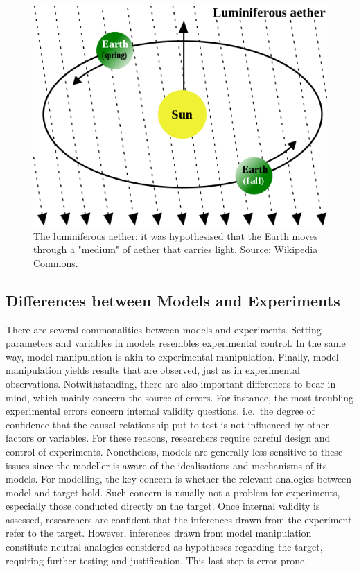 \documentclass[
]{book}
\begin{document}
\begin{figure}

{\centering \includegraphics[width=0.5\linewidth]{Figures/luminiferous_aether} 

}

\caption{The luminiferous aether: it was hypothesised that the Earth moves through a "medium" of aether that carries light. Source: \href{https://commons.wikimedia.org/wiki/File:AetherWind.svg}{Wikipedia Commons}.}\label{fig:aether}
\end{figure}

\hypertarget{differences-between-models-and-experiments}{%
\subsection{Differences between Models and Experiments}\label{differences-between-models-and-experiments}}

There are several commonalities between models and experiments. Setting parameters and variables in models resembles experimental control. In the same way, model manipulation is akin to experimental manipulation. Finally, model manipulation yields results that are observed, just as in experimental observations. Notwithstanding, there are also important differences to bear in mind, which mainly concern the source of errors. For instance, the most troubling experimental errors concern internal validity questions, i.e.~the degree of confidence that the causal relationship put to test is not influenced by other factors or variables. For these reasons, researchers require careful design and control of experiments. Nonetheless, models are generally less sensitive to these issues since the modeller is aware of the idealisations and mechanisms of its models. For modelling, the key concern is whether the relevant analogies between model and target hold. Such concern is usually not a problem for experiments, especially those conducted directly on the target. Once internal validity is assessed, researchers are confident that the inferences drawn from the experiment refer to the target. However, inferences drawn from model manipulation constitute neutral analogies considered as hypotheses regarding the target, requiring further testing and justification. This last step is error-prone.
\end{document}
